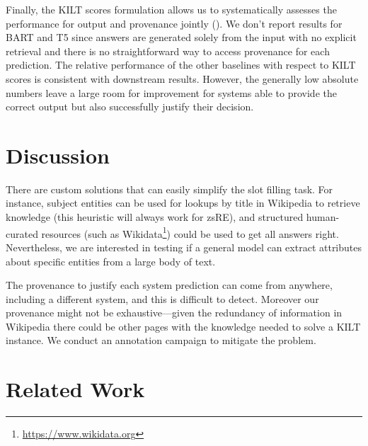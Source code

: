 \documentclass[11pt]{article}
\begin{document}
Finally, the KILT scores formulation allows us to systematically assesses the performance for output and provenance jointly ().
We don't report results for BART and T5 since answers are generated solely from the input with no explicit retrieval and there is no straightforward way to access provenance for each prediction.
The relative performance of the other baselines with respect to KILT scores is consistent with downstream results. However, the generally low absolute numbers leave a large room for improvement for systems able to provide the correct output but also successfully justify their decision. \section{Discussion}



There are custom solutions that can easily simplify the slot filling task. For instance, subject entities can be used for lookups by title in Wikipedia to retrieve knowledge (this heuristic will always work for zsRE), and structured human-curated resources (such as Wikidata\footnote{\url{https://www.wikidata.org}}) could be used to get all answers right. 
Nevertheless, we are interested in testing if a general model can extract attributes about specific entities from a large body of text. 





The provenance to justify each system prediction can come from anywhere, including a different system, and this is difficult to detect.
Moreover our provenance might not be exhaustive---given the redundancy of information in Wikipedia there could be other pages with the knowledge needed to solve a KILT instance. We conduct an annotation campaign to mitigate the problem.

 \section{Related Work}
\end{document}

